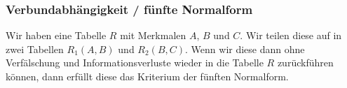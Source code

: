 \begin{center}
\end{center}

\subsubsection{Verbundabhängigkeit / fünfte Normalform}
Wir haben eine Tabelle \(R\) mit Merkmalen \(A\), \(B\) und \(C\). Wir teilen diese auf in zwei Tabellen \(R_{1}(A,B)\) und \(R_{2}(B,C)\). Wenn wir diese dann ohne Verfälschung und Informationsverluste wieder in die Tabelle \(R\) zurückführen können, dann erfüllt diese das Kriterium der fünften Normalform.